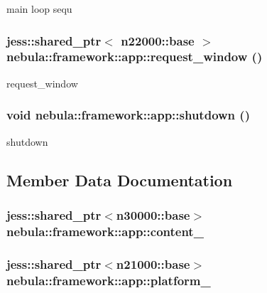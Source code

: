 main loop sequ \hypertarget{classnebula_1_1framework_1_1app_a04794aa6c10b5f10c033b3389799a6f7}{
\subsubsection[{request\_\-window}]{\setlength{\rightskip}{0pt plus 5cm}jess::shared\_\-ptr$<$ {\bf n22000::base} $>$ nebula::framework::app::request\_\-window ()}}
\label{classnebula_1_1framework_1_1app_a04794aa6c10b5f10c033b3389799a6f7}


request\_\-window \hypertarget{classnebula_1_1framework_1_1app_ac1d87e5eff52129168d740a50b09bd9d}{
\subsubsection[{shutdown}]{\setlength{\rightskip}{0pt plus 5cm}void nebula::framework::app::shutdown ()}}
\label{classnebula_1_1framework_1_1app_ac1d87e5eff52129168d740a50b09bd9d}


shutdown 

\subsection{Member Data Documentation}
\hypertarget{classnebula_1_1framework_1_1app_a97da5a51c1a93025a03b3aeeff013e63}{
\subsubsection[{content\_\-}]{\setlength{\rightskip}{0pt plus 5cm}jess::shared\_\-ptr$<${\bf n30000::base}$>$ {\bf nebula::framework::app::content\_\-}}}
\label{classnebula_1_1framework_1_1app_a97da5a51c1a93025a03b3aeeff013e63}
\hypertarget{classnebula_1_1framework_1_1app_a02894b2958189478845ce624ad4b92a9}{
\subsubsection[{platform\_\-}]{\setlength{\rightskip}{0pt plus 5cm}jess::shared\_\-ptr$<${\bf n21000::base}$>$ {\bf nebula::framework::app::platform\_\-}}}
\label{classnebula_1_1framework_1_1app_a02894b2958189478845ce624ad4b92a9}


